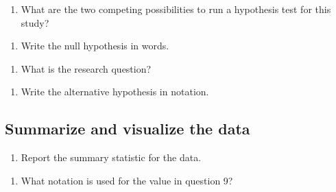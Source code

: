 \documentclass[
]{report}
\providecommand{\tightlist}{%
  \setlength{\itemsep}{0pt}\setlength{\parskip}{0pt}}
\begin{document}
\begin{enumerate}
\def\labelenumi{\arabic{enumi}.}
\setcounter{enumi}{4}
\tightlist
\item
  What are the two competing possibilities to run a hypothesis test for this study?
\end{enumerate}

\vspace{1in}

\begin{enumerate}
\def\labelenumi{\arabic{enumi}.}
\setcounter{enumi}{5}
\tightlist
\item
  Write the null hypothesis in words.
\end{enumerate}

\vspace{1in}

\begin{enumerate}
\def\labelenumi{\arabic{enumi}.}
\setcounter{enumi}{6}
\tightlist
\item
  What is the research question?
\end{enumerate}

\vspace{1in}

\begin{enumerate}
\def\labelenumi{\arabic{enumi}.}
\setcounter{enumi}{7}
\tightlist
\item
  Write the alternative hypothesis in notation.
\end{enumerate}

\vspace{1in}

\newpage

\hypertarget{summarize-and-visualize-the-data}{%
\subsection{Summarize and visualize the data}\label{summarize-and-visualize-the-data}}

\begin{enumerate}
\def\labelenumi{\arabic{enumi}.}
\setcounter{enumi}{8}
\tightlist
\item
  Report the summary statistic for the data.
\end{enumerate}

\vspace{0.3in}

\begin{enumerate}
\def\labelenumi{\arabic{enumi}.}
\setcounter{enumi}{9}
\tightlist
\item
  What notation is used for the value in question 9?
\end{enumerate}
\end{document}
